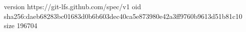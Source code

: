 version https://git-lfs.github.com/spec/v1
oid sha256:daeb68283bc01683d0b6b603dec40ca5e873980e42a3ff9760b9613d51b81c10
size 196704
